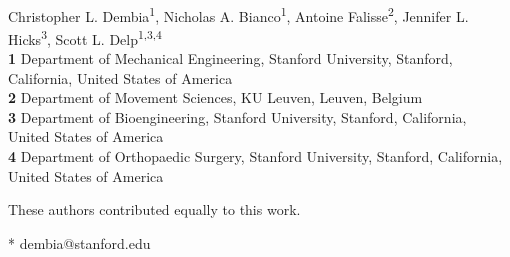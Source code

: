 \documentclass[10pt,letterpaper]{article}
\begin{document}
\vspace*{0.2in}

\begin{flushleft}
{\Large
\textbf{} %
}
\newline
\\
Christopher L. Dembia\textsuperscript{1\Yinyang*},
Nicholas A. Bianco\textsuperscript{1\Yinyang},
Antoine Falisse\textsuperscript{2},
Jennifer L. Hicks\textsuperscript{3},
Scott L. Delp\textsuperscript{1,3,4}
\\
\bigskip
\textbf{1} Department of Mechanical Engineering, Stanford University, Stanford, California, United States of America
\\
\textbf{2} Department of Movement Sciences, KU Leuven, Leuven, Belgium
\\
\textbf{3} Department of Bioengineering, Stanford University, Stanford, California, United States of America
\\
\textbf{4} Department of Orthopaedic Surgery, Stanford University, Stanford, California, United States of America
\\
\bigskip

%
%
\Yinyang These authors contributed equally to this work.





* dembia@stanford.edu

\end{flushleft}
\end{document}
